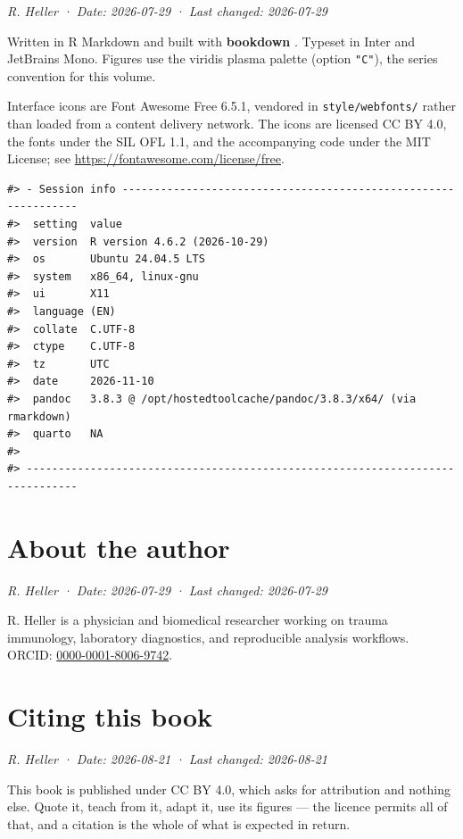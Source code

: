 \documentclass[
  british,
  a4paper,
]{book}
\begin{document}
\emph{R. Heller · Date: 2026-07-29 · Last changed: 2026-07-29}

Written in R Markdown and built with \textbf{bookdown} \citep{R-bookdown}. Typeset in
Inter and JetBrains Mono. Figures use the viridis plasma palette (option \texttt{"C"}),
the series convention for this volume.

Interface icons are Font Awesome Free 6.5.1, vendored in \texttt{style/webfonts/}
rather than loaded from a content delivery network. The icons are licensed
CC BY 4.0, the fonts under the SIL OFL 1.1, and the accompanying code under the
MIT License; see \url{https://fontawesome.com/license/free}.

\begin{verbatim}
#> - Session info ---------------------------------------------------------------
#>  setting  value
#>  version  R version 4.6.2 (2026-10-29)
#>  os       Ubuntu 24.04.5 LTS
#>  system   x86_64, linux-gnu
#>  ui       X11
#>  language (EN)
#>  collate  C.UTF-8
#>  ctype    C.UTF-8
#>  tz       UTC
#>  date     2026-11-10
#>  pandoc   3.8.3 @ /opt/hostedtoolcache/pandoc/3.8.3/x64/ (via rmarkdown)
#>  quarto   NA
#> 
#> ------------------------------------------------------------------------------
\end{verbatim}

\chapter*{About the author}\label{about-the-author}

\emph{R. Heller · Date: 2026-07-29 · Last changed: 2026-07-29}

R. Heller is a physician and biomedical researcher working on trauma
immunology, laboratory diagnostics, and reproducible analysis workflows.
ORCID: \href{https://orcid.org/0000-0001-8006-9742}{0000-0001-8006-9742}.

\chapter*{Citing this book}\label{citing}

\emph{R. Heller · Date: 2026-08-21 · Last changed: 2026-08-21}

This book is published under CC BY 4.0, which asks for attribution and nothing
else. Quote it, teach from it, adapt it, use its figures --- the licence permits
all of that, and a citation is the whole of what is expected in return.
\end{document}
